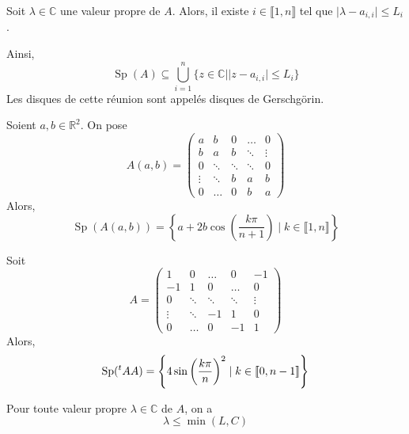   \begin{theorem}
    \label{153-1}
    Soit $\lambda \in \mathbb{C}$ une valeur propre de $A$. Alors, il existe $i \in \llbracket 1, n \rrbracket$ tel que $\vert \lambda - a_{i,i} \vert \leq L_i$.
  \end{theorem}
  
  
  \begin{remark}
    Ainsi,
    \[ \operatorname{Sp}(A) \subseteq \bigcup_{i=1}^n \{ z \in \mathbb{C} \mid \vert z - a_{i,i} \vert \leq L_i \} \]
    Les disques de cette réunion sont appelés disques de Gerschgörin.
  \end{remark}
  
  
  \begin{example}
    Soient $a, b \in \mathbb{R}^2$. On pose
    \[
      A(a,b) =
       \begin{pmatrix}
         a & b & 0 & \dots & 0 \\
         b & a & b & \ddots & \vdots \\
         0 & \ddots & \ddots & \ddots & 0 \\
         \vdots & \ddots & b & a & b \\
         0 & \dots & 0 & b & a
       \end{pmatrix}
     \]
     Alors,
     \[ \operatorname{Sp}(A(a,b)) = \left\{ a + 2b \cos \left( \frac{k \pi}{n+1} \right) \mid k \in \llbracket 1, n \rrbracket \right\} \]
  \end{example}
  
  \begin{example}
    Soit
    \[
      A =
      \begin{pmatrix}
        1 & 0 & \dots & 0 & -1 \\
        -1 & 1 & 0 & \dots & 0 \\
        0 & \ddots & \ddots & \ddots & \vdots \\
        \vdots & \ddots & -1 & 1 & 0 \\
        0 & \dots & 0 & -1 & 1
      \end{pmatrix}
    \]
    Alors,
    \[ \operatorname{Sp}(\mathstrut ^t AA) = \left\{ 4 \sin \left( \frac{k \pi}{n} \right)^2 \mid k \in \llbracket 0, n-1 \rrbracket \right\} \]
  \end{example}
  
  
  \begin{corollary}
    Pour toute valeur propre $\lambda \in \mathbb{C}$ de $A$, on a
    \[ \lambda \leq \min(L,C) \]
  \end{corollary}
  
